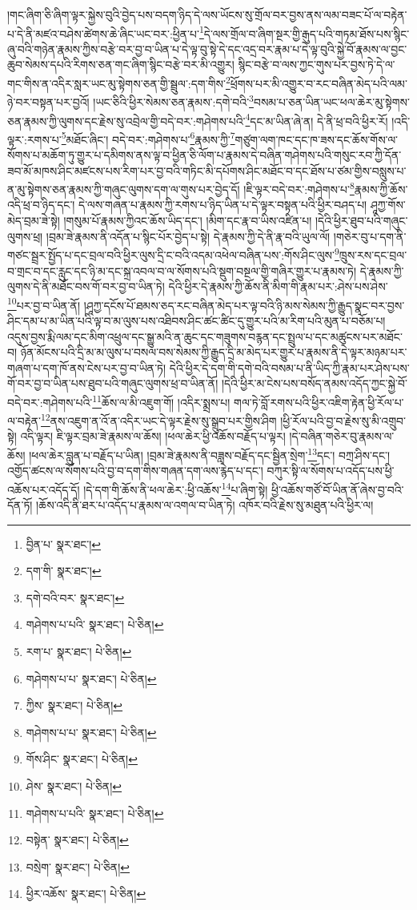 །གང་ཞིག་ཅི་ཞིག་ལྟར་སྐྱེས་བུའི་བྱེད་པས་བདག་ཉིད་དེ་ལས་ཡོངས་སུ་གྲོལ་བར་བྱས་ནས་ལམ་བཟང་པོ་ལ་བརྟེན་པ་དེ་ནི་མཛའ་བཤེས་ཚེགས་ཆེ་ཞིང་ཡང་བར་:ཕྱིན་པ་\footnote{བྱིན་པ་  སྣར་ཐང་། }དེ་ལས་གྲོལ་བ་ཞིག་སྔར་གྱི་རྒུད་པའི་གཏམ་ཐོས་པས་སྙིང་ཞུ་བའི་གཉེན་རྣམས་ཀྱིས་བརྩེ་བར་བྱ་བ་ཡིན་པ་དེ་ལྟ་བུ་སྟེ་དེ་དང་འདྲ་བར་རྣམ་པ་དེ་ལྟ་བུའི་སྐྱེ་བོ་རྣམས་ལ་བྱང་ཆུབ་སེམས་དཔའི་རིགས་ཅན་གང་ཞིག་སྙིང་བརྩེ་བར་མི་འགྱུར། སྙིང་བརྩེ་བ་ལས་ཀྱང་གུས་པར་བྱས་ཏེ་དེ་ལ་གང་གིས་ན་འདིར་སླར་ཡང་མུ་སྟེགས་ཅན་གྱི་སྦྲུལ་:དག་གིས་\footnote{དག་གི་  སྣར་ཐང་། }ཕྲོགས་པར་མི་འགྱུར་བ་རང་བཞིན་མེད་པའི་ལམ་ཉེ་བར་བསྟན་པར་བྱའོ། །ཡང་ཅིའི་ཕྱིར་སེམས་ཅན་རྣམས་:དགེ་བའི་\footnote{དགེ་བའི་བར་  སྣར་ཐང་། }བསམ་པ་ཅན་ཡིན་ཡང་ཕལ་ཆེར་མུ་སྟེགས་ཅན་རྣམས་ཀྱི་ལུགས་དང་རྗེས་སུ་འབྲེལ་གྱི་བདེ་བར་:གཤེགས་པའི་\footnote{གཤེགས་པ་པའི་  སྣར་ཐང་།  པེ་ཅིན། }དང་མ་ཡིན་ཞེ་ན། དེ་ནི་ཕྲ་བའི་ཕྱིར་རོ། །འདི་ལྟར་:རགས་པ་\footnote{རག་པ་  སྣར་ཐང་།  པེ་ཅིན། }མཐོང་ཞིང་། བདེ་བར་:གཤེགས་པ་\footnote{གཤེགས་པ་པ་  སྣར་ཐང་།  པེ་ཅིན། }རྣམས་ཀྱི་\footnote{ཀྱིས་  སྣར་ཐང་།  པེ་ཅིན། }གཙུག་ལག་ཁང་དང་ཁ་ཟས་དང་ཆོས་གོས་ལ་སོགས་པ་མཆོག་ཏུ་གྱུར་པ་དམིགས་ནས་ལྟ་བ་ཕྱིན་ཅི་ལོག་པ་རྣམས་དེ་བཞིན་གཤེགས་པའི་གསུང་རབ་ཀྱི་དོན་ཟབ་མོ་མཁས་ཤིང་མཛངས་པས་རིག་པར་བྱ་བའི་གཏིང་མི་དཔོགས་ཤིང་མཐོང་བ་དང་ཐོས་པ་ཙམ་གྱིས་བསླུས་པ་ན་མུ་སྟེགས་ཅན་རྣམས་ཀྱི་གཞུང་ལུགས་དག་ལ་གུས་པར་བྱེད་དོ། །ཇི་ལྟར་བདེ་བར་:གཤེགས་པ་\footnote{གཤེགས་པ་པ་  སྣར་ཐང་།  པེ་ཅིན། }རྣམས་ཀྱི་ཆོས་འདི་ཕྲ་བ་ཉིད་དང་། དེ་ལས་གཞན་པ་རྣམས་ཀྱི་རགས་པ་ཉིད་ཡིན་པ་དེ་ལྟར་བསྟན་པའི་ཕྱིར་བཤད་པ། ཤཱཀྱ་གོས་མེད་བྲམ་ཟེ་སྟེ། །གསུམ་པོ་རྣམས་ཀྱིའང་ཆོས་ཡིད་དང་། །མིག་དང་རྣ་བ་ཡིས་འཛིན་པ། །དེའི་ཕྱིར་ཐུབ་པའི་གཞུང་ལུགས་ཕྲ། །བྲམ་ཟེ་རྣམས་ནི་འདོན་པ་སྙིང་པོར་བྱེད་པ་སྟེ། དེ་རྣམས་ཀྱི་དེ་ནི་རྣ་བའི་ཡུལ་ལོ། །གཅེར་བུ་པ་དག་ནི་གཙང་སྦྲར་སྤྱོད་པ་དང་བྲལ་བའི་ཕྱིར་ལུས་དྲི་ང་བའི་འདམ་འཕེལ་བཞིན་པས་:གོས་ཤིང་ལུས་\footnote{གོས་ཤིང་  སྣར་ཐང་།  པེ་ཅིན། }ཁྲུས་རས་དང་བྲལ་བ་གྲང་བ་དང་རླུང་དང་ཉི་མ་དང་སྐྲ་འབལ་བ་ལ་སོགས་པའི་སྡུག་བསྔལ་གྱི་གཞིར་གྱུར་པ་རྣམས་ཏེ། དེ་རྣམས་ཀྱི་ལུགས་དེ་ནི་མཐོང་བས་གོ་བར་བྱ་བ་ཡིན་ཏེ། དེའི་ཕྱིར་དེ་རྣམས་ཀྱི་ཆོས་ནི་མིག་གི་རྣམ་པར་:ཤེས་པས་ཤེས་\footnote{ཤེས་  སྣར་ཐང་།  པེ་ཅིན། }པར་བྱ་བ་ཡིན་ནོ། །ཤཱཀྱ་དངོས་པོ་ཐམས་ཅད་རང་བཞིན་མེད་པར་ལྟ་བའི་ཉི་མས་སེམས་ཀྱི་རྒྱུད་སྣང་བར་བྱས་ཤིང་དམ་པ་མ་ཡིན་པའི་ལྟ་བ་མ་ལུས་པས་འཐིབས་ཤིང་ཚང་ཚིང་དུ་གྱུར་པའི་མ་རིག་པའི་མུན་པ་བཅོམ་པ། འདུས་བྱས་རྨི་ལམ་དང་མིག་འཕྲུལ་དང་སྒྱུ་མའི་ན་ཆུང་དང་གཟུགས་བརྙན་དང་སྤྲུལ་པ་དང་མཚུངས་པར་མཐོང་བ། ཉོན་མོངས་པའི་དྲི་མ་མ་ལུས་པ་བསལ་བས་སེམས་ཀྱི་རྒྱུད་དྲི་མ་མེད་པར་གྱུར་པ་རྣམས་ནི་དེ་ལྟར་མཉམ་པར་གཞག་པ་དག་ཁོ་ནས་ངེས་པར་བྱ་བ་ཡིན་ཏེ། དེའི་ཕྱིར་དེ་དག་གི་དགེ་བའི་བསམ་པ་ནི་ཡིད་ཀྱི་རྣམ་པར་ཤེས་པས་གོ་བར་བྱ་བ་ཡིན་པས་ཐུབ་པའི་གཞུང་ལུགས་ཕྲ་བ་ཡིན་ནོ། །དེའི་ཕྱིར་མ་ངེས་པས་བསོད་ནམས་འདོད་ཀྱང་སྐྱེ་བོ་བདེ་བར་:གཤེགས་པའི་\footnote{གཤེགས་པ་པའི་  སྣར་ཐང་།  པེ་ཅིན། }ཆོས་ལ་མི་འཇུག་གོ། །འདིར་སྨྲས་པ། གལ་ཏེ་བློ་རགས་པའི་ཕྱིར་འཇིག་རྟེན་ཕྱི་རོལ་པ་ལ་བརྟེན་\footnote{བསྟེན་  སྣར་ཐང་།  པེ་ཅིན། }ནས་འཇུག་ན་འོ་ན་འདིར་ཡང་དེ་ལྟར་རྗེས་སུ་སྒྲུབ་པར་གྱིས་ཤིག །ཕྱི་རོལ་པའི་བྱ་བ་རྗེས་སུ་མི་འགྲུབ་སྟེ། འདི་ལྟར། ཇི་ལྟར་བྲམ་ཟེ་རྣམས་ལ་ཆོས། །ཕལ་ཆེར་ཕྱི་འཆོས་བརྗོད་པ་ལྟར། །དེ་བཞིན་གཅེར་བུ་རྣམས་ལ་ཆོས། །ཕལ་ཆེར་བླུན་པ་བརྗོད་པ་ཡིན། །བྲམ་ཟེ་རྣམས་ནི་བཟླས་བརྗོད་དང་སྦྱིན་སྲེག་\footnote{བསྲེག་  སྣར་ཐང་།  པེ་ཅིན། }དང་། བཀྲ་ཤིས་དང་། འགྱོད་ཚངས་ལ་སོགས་པའི་བྱ་བ་དག་གིས་གཞན་དག་ལས་རྙེད་པ་དང་། བཀུར་སྟི་ལ་སོགས་པ་འདོད་པས་ཕྱི་འཆོས་པར་འདོད་དོ། །དེ་དག་གི་ཆོས་ནི་ཕལ་ཆེར་:ཕྱི་འཆོས་\footnote{ཕྱིར་འཆོས་  སྣར་ཐང་།  པེ་ཅིན། }པ་ཞིག་སྟེ། ཕྱི་འཆོས་གཙོ་བོ་ཡིན་ནོ་ཞེས་བྱ་བའི་དོན་ཏོ། །ཆོས་འདི་ནི་ཐར་པ་འདོད་པ་རྣམས་ལ་འགལ་བ་ཡིན་ཏེ། འཁོར་བའི་རྗེས་སུ་མཐུན་པའི་ཕྱིར་ལ། 